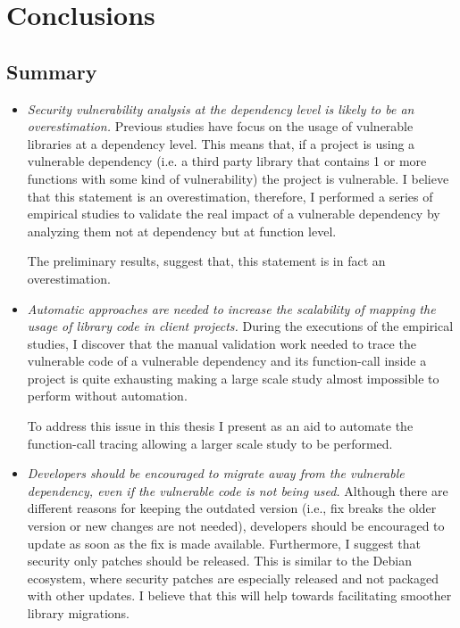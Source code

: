 \chapter{Conclusions}
\label{sec:conclusions}
\section{Summary}
\begin{itemize}
    \item \textit{Security vulnerability analysis at the dependency level is likely to be an overestimation.}
    Previous studies have focus on the usage of vulnerable libraries at a dependency level. This means that, if a project is using a vulnerable dependency (i.e. a third party library that contains 1 or more functions with some kind of vulnerability) the project is vulnerable. I believe that this statement is an overestimation, therefore, I performed a series of empirical studies to validate the real impact of a vulnerable dependency by analyzing them not at dependency but at function level.
    
    The preliminary results, suggest that, this statement is in fact an overestimation. 

    \item \textit{Automatic approaches are needed to increase the scalability of mapping the usage of library code in client projects. }
    During the executions of the empirical studies, I discover that the manual validation work needed to trace the vulnerable code of a vulnerable dependency and its function-call inside a project is quite exhausting making a large scale study almost impossible to perform without automation.
    
    To address this issue in this thesis I present \tool[] as an aid to automate the function-call tracing allowing a larger scale study to be performed.
    
    \item \textit{Developers should be encouraged to migrate away from the vulnerable dependency, even if the vulnerable code is not being used.}
    Although there are different reasons for keeping the outdated version (i.e., fix breaks the older version or new changes are not needed), developers should be encouraged to update as soon as the fix is made available.
    Furthermore, I suggest that security only patches should be released.
    This is similar to the Debian ecosystem, where security patches are especially released and not packaged with other updates.
    I believe that this will help towards facilitating smoother library migrations.
\end{itemize}

